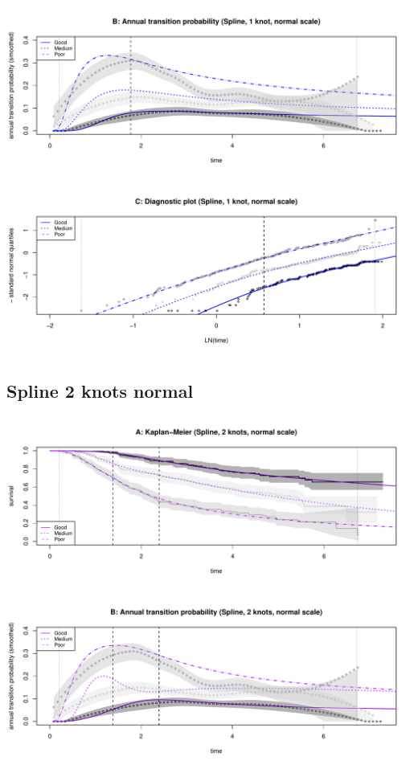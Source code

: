 \documentclass[]{article}
\begin{document}
\begin{flushleft}\includegraphics[height=0.25\textheight]{Images/spline_norm1-2} \end{flushleft}

\begin{flushleft}\includegraphics[height=0.25\textheight]{Images/spline_norm1-3} \end{flushleft}

\newpage 

\subsection{Spline 2 knots normal}\label{spline-2-knots-normal}

\begin{flushleft}\includegraphics[height=0.25\textheight]{Images/spline_norm2-1} \end{flushleft}

\begin{flushleft}\includegraphics[height=0.25\textheight]{Images/spline_norm2-2} \end{flushleft}
\end{document}

